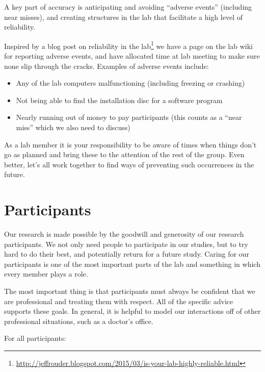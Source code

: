 \documentclass[letterpaper,12pt,oneside]{memoir}
\begin{document}
A key part of accuracy is anticipating and avoiding ``adverse events'' (including near misses), and creating structures in the lab that facilitate a high level of reliability.

Inspired by a blog post on reliability in the lab\footnote{\url{http://jeffrouder.blogspot.com/2015/03/is-your-lab-highly-reliable.html}} we have a page on the lab wiki for reporting adverse events, and have allocated time at lab meeting to make sure none slip through the cracks. Examples of adverse events include:

\begin{itemize}
\item Any of the lab computers malfunctioning (including freezing or crashing)
\item Not being able to find the installation disc for a software program
\item Nearly running out of money to pay participants (this counts as a ``near miss'' which we also need to discuss)
\end{itemize}

As a lab member it is your responsibility to be aware of times when things don't go as planned and bring these to the attention of the rest of the group. Even better, let's all work together to find ways of preventing such occurrences in the future.



\section{Participants}
\label{sec:participants}

Our research is made possible by the goodwill and generosity of our research participants. We not only need people to participate in our studies, but to try hard to do their best, and potentially return for a future study. Caring for our participants is one of the most important parts of the lab and something in which every member plays a role.

The most important thing is that participants must always be confident that we are professional and treating them with respect. All of the specific advice supports these goals. In general, it is helpful to model our interactions off of other professional situations, such as a doctor's office.

For all participants:
\end{document}
